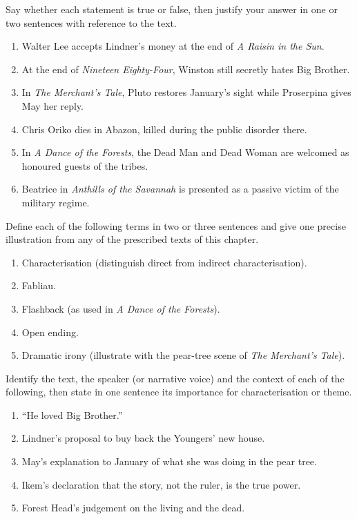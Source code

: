 \documentclass[11pt]{article}
\newcommand{\cle}[1]{{\popxbold\color{popdark}#1}}
\begin{document}
\begin{exercice}
Say whether each statement is true or false, then justify your answer in one or two sentences with reference to the text.
\begin{enumerate}
\item Walter Lee accepts Lindner's money at the end of \emph{A Raisin in the Sun}.
\item At the end of \emph{Nineteen Eighty-Four}, Winston still secretly hates Big Brother.
\item In \emph{The Merchant's Tale}, Pluto restores January's sight while Proserpina gives May her reply.
\item Chris Oriko dies in Abazon, killed during the public disorder there.
\item In \emph{A Dance of the Forests}, the Dead Man and Dead Woman are welcomed as honoured guests of the tribes.
\item Beatrice in \emph{Anthills of the Savannah} is presented as a passive victim of the military regime.
\end{enumerate}
\end{exercice}

\begin{exercice}
Define each of the following terms in two or three sentences and give one precise illustration from any of the prescribed texts of this chapter.
\begin{enumerate}
\item \cle{Characterisation} (distinguish direct from indirect characterisation).
\item \cle{Fabliau}.
\item \cle{Flashback} (as used in \emph{A Dance of the Forests}).
\item \cle{Open ending}.
\item \cle{Dramatic irony} (illustrate with the pear-tree scene of \emph{The Merchant's Tale}).
\end{enumerate}
\end{exercice}

\begin{exercice}
Identify the text, the speaker (or narrative voice) and the context of each of the following, then state in one sentence its importance for characterisation or theme.
\begin{enumerate}
\item ``He loved Big Brother.''
\item Lindner's proposal to buy back the Youngers' new house.
\item May's explanation to January of what she was doing in the pear tree.
\item Ikem's declaration that the story, not the ruler, is the true power.
\item Forest Head's judgement on the living and the dead.
\end{enumerate}
\end{exercice}
\end{document}
